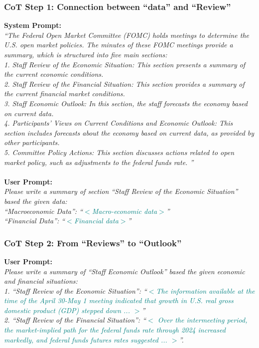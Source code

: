 \subsubsection*{CoT Step 1: Connection between ``data'' and ``Review'' }
\textbf{System Prompt:}\\
{\footnotesize
\textit{``The Federal Open Market Committee (FOMC) holds meetings to determine the U.S. open market policies. The minutes of these FOMC meetings provide a summary, which is structured into five main sections: \\
1. Staff Review of the Economic Situation: This section presents a summary of the current economic conditions.\\
2. Staff Review of the Financial Situation: This section provides a summary of the current financial market conditions.\\
3. Staff Economic Outlook: In this section, the staff forecasts the economy based on current data.\\
4. Participants' Views on Current Conditions and Economic Outlook: This section includes forecasts about the economy based on current data, as provided by other participants.\\
5. Committee Policy Actions: This section discusses actions related to open market policy, such as adjustments to the federal funds rate.
''}} \\
~\\
\textbf{User Prompt:}\\
{\footnotesize
\textit{Please write a summary of section ``Staff Review of the Economic Situation'' based the given data: \\
``Macroeconomic Data'': ``\textcolor{teal}{$<$Macro-economic data$>$}''\\
``Financial Data'': ``\textcolor{teal}{$<$Financial data$>$}''
}} 
~\\
\subsubsection*{CoT Step 2: From ``Reviews'' to ``Outlook''}
\textbf{User Prompt:}\\
{\footnotesize
\textit{Please write a summary of ``Staff Economic Outlook'' based the given economic and financial situations: \\
1. ``Staff Review of the Economic Situation'':  ``\textcolor{teal}{$<$The information available at the time of the April 30-May 1 meeting indicated that growth in U.S. real gross domestic product (GDP) stepped down  ... $>$}'' \\
2. ``Staff Review of the Financial Situation'': ``\textcolor{teal}{$<$ Over the intermeeting period, the market-implied path for the federal funds rate through 2024 increased markedly, and federal funds futures rates suggested  ... $>$}''. 
}} 
~\\
